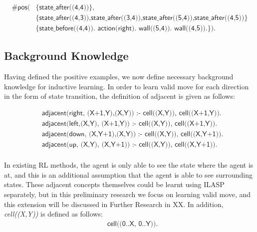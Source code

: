 \begin{examp}
\begin{equation}
\begin{split}
\textsf{\#pos(} & \textsf{\{state\_after((4,4))\}}, \\
                & \textsf{\{state\_after((4,3)),state\_after((3,4)),state\_after((5,4)),state\_after((4,5))\}} \\
                & \textsf{\{state\_before((4,4)). action(right). wall((5,4)). wall((4,5)).\}).}
\end{split}
\end{equation}

\end{examp}
\label{state_transition_example}

\subsection{Background Knowledge}
Having defined the positive examples, we now define necessary background knowledge for inductive learning.
In order to learn valid move for each direction in the form of state transition, the definition of adjacent is given as follows:

\begin{equation}
\begin{split}
&\textsf{adjacent(right, (X+1,Y),(X,Y)) :- cell((X,Y)), cell((X+1,Y)).} \\
&\textsf{adjacent(left,(X,Y),  (X+1,Y)) :- cell((X,Y)), cell((X+1,Y)).} \\
&\textsf{adjacent(down, (X,Y+1),(X,Y)) :- cell((X,Y)), cell((X,Y+1)).} \\
&\textsf{adjacent(up,   (X,Y),  (X,Y+1)) :- cell((X,Y)), cell((X,Y+1)).} \\
\end{split}
\end{equation}
    
In existing RL methods, the agent is only able to see the state where the agent is at, and this is an additional assumption that the agent is able to see surrounding states.
These adjacent concepts themselves could be learnt using ILASP separately, but in this preliminary research we focus on learning valid move, and this extension will be discussed in Further Research in XX.
In addition, \textit{cell((X,Y))} is defined as follows:
\begin{equation}
\begin{split}
    &\textsf{cell((0..X, 0..Y)).}
\end{split}
\end{equation}


